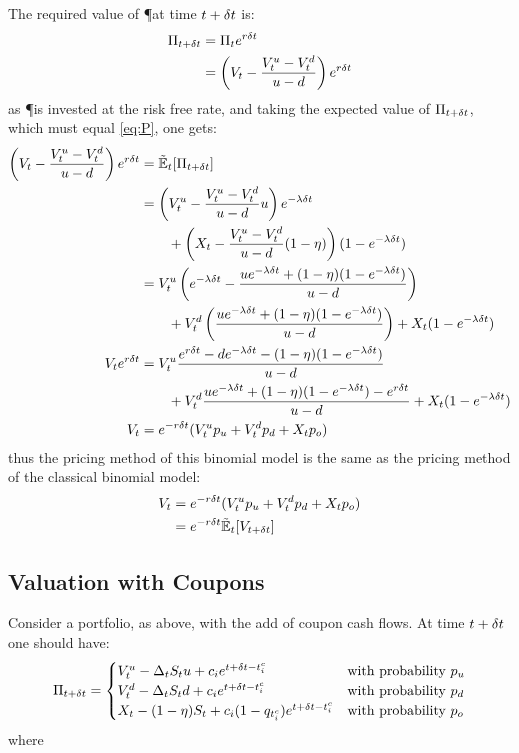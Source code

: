 \documentclass[a4paper,11pt,oneside]{report}
\theoremstyle{plain}
\theoremstyle{definition}
\begin{document}
The required value of \P at time $t + \delta t$ is:
\begin{align}
 \Pi_{t + \delta t}  &= \Pi_t e^{r\delta t} \nonumber\\
                &= \left(V_t - \frac{V^{u}_t - V^{d}_t}{u - d}\right) e^{r\delta t} \label{eq:P}
\end{align}
as \P is invested at the risk free rate, and taking the expected value of $\Pi_{t + \delta t}$, which must equal \eqref{eq:P}, one gets:
\begin{align}
 \left(\V - \frac{\Vu - \Vd}{u - d}\right) e^{r\Dt} &= \Et[\Pi_{t + \Dt}] \n
        &= \left(\Vu - \frac{\Vu - \Vd}{u - d}u\right) e^{-\lambda\Dt} \n
        &\qquad + \left(\X - \frac{\Vu - \Vd}{u - d}(1 - \eta)\right)(1 - e^{-\lambda\Dt}) \n
        &= \Vu\left(e^{-\lambda\Dt} - \frac{ue^{-\lambda\Dt} + (1 - \eta)(1 - e^{-\lambda\Dt})}{u - d}\right) \n
        &\qquad + \Vd\left(\frac{ue^{-\lambda\Dt} + (1 - \eta)(1 - e^{-\lambda\Dt})}{u - d}\right) + \X(1 - e^{-\lambda\Dt}) \n
 \V e^{r\Dt} &= \Vu\frac{e^{r\Dt} - de^{-\lambda\Dt} - (1 - \eta)(1 - e^{-\lambda\Dt})}{u - d} \n
        &\qquad + \Vd\frac{ue^{-\lambda\Dt} + (1 - \eta)(1 - e^{-\lambda\Dt}) - e^{r\Dt}}{u - d} + \X(1 - e^{-\lambda\Dt}) \n
 \V     &= e^{-r\Dt}(\Vu\pu + \Vd\pd + \X\po)
\end{align}
thus the pricing method of this binomial model is the same as the pricing method of the classical binomial model:
\begin{align}
 V_t    &= e^{-r\Dt}(\Vu\pu + \Vd\pd + \X\po) \n
        &= e^{-r\Dt}\Et[V_{t + \Dt}]
\end{align}


\subsection{Valuation with Coupons}
Consider a portfolio, as above, with the add of coupon cash flows.  At time $t + \delta t$ one should have:
\begin{equation*}
 \Pi_{t + \delta t} =
 \begin{cases}
  V^{u}_t - \Delta_tS_t u + c_i e^{t + \delta t - t^{c}_i}      & \text{with probability } p_u \\
  V^{d}_t - \Delta_tS_t d + c_i e^{t + \delta t - t^{c}_i}      & \text{with probability } p_d\\
  X_t - (1 - \eta)S_t + c_i (1 - q_{t^{c}_i})e^{t + \delta t - t^{c}_i} & \text{with probability } p_o\\
 \end{cases}
\end{equation*}
where
\end{document}
